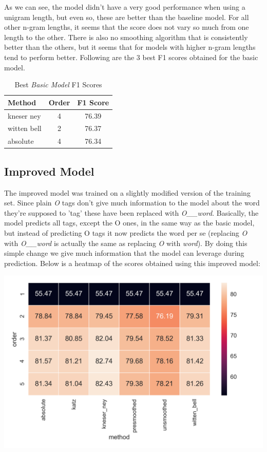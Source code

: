 \documentclass[11pt,a4paper]{article}
\begin{document}
	As we can see, the model didn't have a very good performance when using a unigram length, but even so, these are better than the baseline model. For all other n-gram lengths, it seems that the score does not vary so much from one length to the other. There is also no smoothing algorithm that is consistently better than the others, but it seems that for models with higher n-gram lengths tend to perform better. Following are the 3 best F1 scores obtained for the basic model.
	
		
	\begin{table}[h]
		\centering
		\begin{tabularx}{155pt}{l | c | c}

			\textbf{Method} & \textbf{Order} & \textbf{F1 Score} \\
			\hline 
			kneser ney & 4 & 76.39 \\
			\hline
			witten bell & 2 & 76.37 \\
			absolute & 4 & 76.34 \\
			
		\end{tabularx} 
		\caption{Best \textit{Basic Model} F1 Scores}
		\label{table:basic-method-scores}	
	\end{table}
	
		
\subsection{Improved Model}
	
	The improved model was trained on a slightly modified version of the training set. Since plain \textit{O} tags don't give much information to the model about the word they're supposed to 'tag' these have been replaced with \textit{O\_\_word}. Basically, the model predicts all tags, except the O ones, in the same way as the basic model, but instead of predicting O tags it now predicts the word per se (replacing \textit{O} with \textit{O\_\_word} is actually the same as replacing \textit{O} with \textit{word}). By doing this simple change we give much information that the model can leverage during prediction. Below is a heatmap of the scores obtained using this improved model:
	
	\hspace*{-0.6cm}\includegraphics[scale=0.6]{scores_heatmap_w2iob__w}
\end{document}
